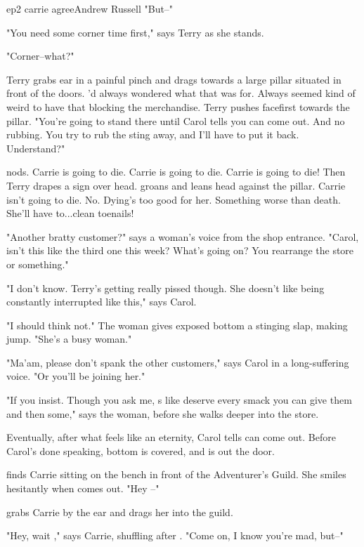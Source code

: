 \documentclass{book}
\begin{document}
\begin{childnode}{ep2 carrie agree}{Andrew Russell}
     "But--"

     "You need some corner time first," says Terry as she stands. 

     "Corner--what?"

     Terry grabs \names{} ear in a painful pinch and drags \himher{} towards a large pillar situated in front of the doors. \name{}'d always wondered what that was for. Always seemed kind of 
     weird to have that blocking the merchandise. Terry pushes \name{} facefirst towards the pillar. "You're going to stand there until Carol tells you can come out. And no rubbing. You try to
     rub the sting away, and I'll have to put it back. Understand?"
     
     \name{} nods. Carrie is going to die. Carrie is going to die. Carrie is going to die! Then Terry drapes a sign over \names{} head. \name{} groans and leans \hisher{} head against the pillar.
     Carrie isn't going to die. No. Dying's too good for her. Something worse than death. She'll have to...clean \names{} toenails!

     "Another bratty customer?" says a woman's voice from the shop entrance. "Carol, isn't this like the third one this week? What's going on? You rearrange the store or something."

     "I don't know. Terry's getting really pissed though. She doesn't like being constantly interrupted  like this," says Carol.

     "I should think not." The woman gives \names{} exposed bottom a stinging slap, making \himher{} jump. "She's a busy woman."

     "Ma'am, please don't spank the other customers," says Carol in a long-suffering voice. "Or you'll be joining her."

     "If you insist. Though you ask me, \boygirl{}s like \himher{} deserve every smack you can give them and then some," says the woman, before she walks deeper into the store.

     Eventually, after what feels like an eternity, Carol tells \name{} \heshe{} can come out. Before Carol's done speaking, \names{} bottom is covered, and \heshe{} is out the door.

     \HeShe{} finds Carrie sitting on the bench in front of the Adventurer's Guild. She smiles hesitantly when \name{} comes out. "Hey \nickname{}--"

     \name{} grabs Carrie by the ear and drags her into the guild.

     "Hey, wait \nickname{}," says Carrie, shuffling after \name{}. "Come on, I know you're mad, but--"


\end{childnode}
\end{document}
